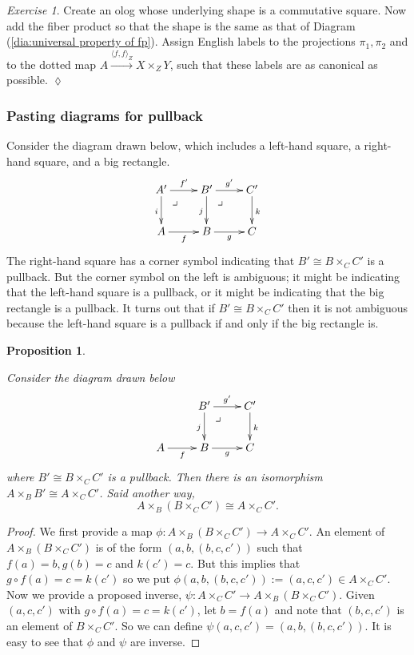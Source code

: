 \documentclass{book}
\makeatletter
\def\to{\rightarrow}
\def\taking{\colon}
\def\iso{\cong}
\def\la{\langle}
\def\ra{\rangle}
\def\ullimit{\ar@{}[rd]|(.3)*+{\lrcorner}}
\newcommand{\To}[1]{\xrightarrow{#1}}
\newcommand{\prodmap}[2]{\la#1,#2\ra}
\newcommand{\pb}[3]{\prodmap{#1}{#1}_{#3}}
\newtheorem{proposition}[subsubsection]{Proposition}
\theoremstyle{remark}
\newtheorem{exc}[subsubsection]{Exercise}
\newenvironment{exercise}{\begin{exc}}{\hspace*{\fill}$\lozenge$\end{exc}}
\theoremstyle{definition}
\makeatother
\begin{document}
\begin{exercise}
Create an olog whose underlying shape is a commutative square. Now add the fiber product so that the shape is the same as that of Diagram (\ref{dia:universal property of fp}). Assign English labels to the projections $\pi_1,\pi_2$ and to the dotted map $A\To{\pb{f}{g}{Z}}X\times_ZY$, such that these labels are as canonical as possible.
\end{exercise}


\subsubsection{Pasting diagrams for pullback}

Consider the diagram drawn below, which includes a left-hand square, a right-hand square, and a big rectangle.
$$
\xymatrix{
A'\ar[r]^{f'}\ar[d]_i\ullimit&B'\ar[r]^{g'}\ar[d]_j\ullimit&C'\ar[d]^k\\
A\ar[r]_f&B\ar[r]_g&C}
$$
The right-hand square has a corner symbol indicating that $B'\iso B\times_CC'$ is a pullback. But the corner symbol on the left is ambiguous; it might be indicating that the left-hand square is a pullback, or it might be indicating that the big rectangle is a pullback. It turns out that if $B'\iso B\times_CC'$ then it is not ambiguous because the left-hand square is a pullback if and only if the big rectangle is.

\begin{proposition}\label{prop:pasting}

Consider the diagram drawn below
$$
\xymatrix{
&B'\ar[r]^{g'}\ar[d]_j\ullimit&C'\ar[d]^k\\
A\ar[r]_f&B\ar[r]_g&C}
$$
where $B'\iso B\times_CC'$ is a pullback. Then there is an isomorphism $A\times_BB'\iso A\times_CC'$. Said another way, $$A\times_B(B\times_CC')\iso A\times_CC'.$$

\end{proposition}

\begin{proof}

We first provide a map $\phi\taking A\times_B(B\times_CC')\to A\times_CC'$. An element of $A\times_B(B\times_CC')$ is of the form $(a,b,(b,c,c'))$ such that $f(a)=b, g(b)=c$ and $k(c')=c$. But this implies that $g\circ f(a)=c=k(c')$ so we put $\phi(a,b,(b,c,c')):=(a,c,c')\in A\times_CC'$. Now we provide a proposed inverse, $\psi\taking A\times_CC'\to A\times_B(B\times_CC')$. Given $(a,c,c')$ with $g\circ f(a)=c=k(c')$, let $b=f(a)$ and note that $(b,c,c')$ is an element of $B\times_CC'$. So we can define $\psi(a,c,c')=(a,b,(b,c,c'))$. It is easy to see that $\phi$ and $\psi$ are inverse.
 
\end{proof}
\end{document}
